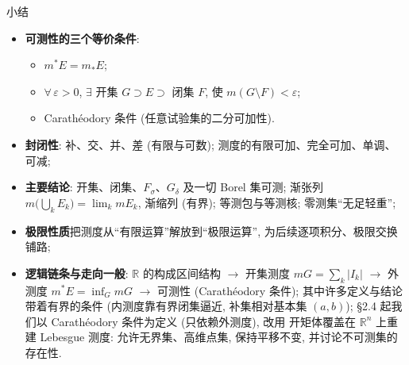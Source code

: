 \begin{frame}{小结}

\begin{itemize}
\item \textbf{可测性的三个等价条件}:
\begin{itemize}
\item $m^* E = m_* E$;
\item $\forall\, \varepsilon > 0$, $\exists$ 开集 $G \supset E \supset$ 闭集 $F$, 使 $m(G \setminus F) < \varepsilon$;
\item Carath\'{e}odory 条件 (任意试验集的二分可加性).
\end{itemize}
\pause
\item \textbf{封闭性}: 补、交、并、差 (有限与可数); 测度的有限可加、完全可加、单调、可减;
\pause
\item \textbf{主要结论}: 开集、闭集、$F_\sigma$、$G_\delta$ 及一切 Borel 集可测; 渐张列 $m\big(\bigcup_k E_k\big) = \lim_k mE_k$, 渐缩列 (有界); 等测包与等测核; 零测集``无足轻重'';
\pause
\item \textbf{极限性质}把测度从``有限运算''解放到``极限运算'', 为后续逐项积分、极限交换铺路;
\pause
\item \textbf{逻辑链条与走向一般}: $\mathbb{R}$ 的构成区间结构 $\longrightarrow$ 开集测度 $mG = \sum_k |I_k|$ $\longrightarrow$ 外测度 $m^* E = \inf_G mG$ $\longrightarrow$ 可测性 (Carath\'{e}odory 条件); 其中许多定义与结论带着\alert{有界}的条件 (内测度靠有界闭集逼近, 补集相对基本集 $(a,b)$); §2.4 起我们\alert{以 Carath\'{e}odory 条件为定义} (只依赖外测度), 改用 \alert{开矩体覆盖}在 $\mathbb{R}^n$ 上重建 Lebesgue 测度: 允许\alert{无界集}、高维点集, 保持平移不变, 并讨论\alert{不可测集的存在性}.
\end{itemize}

\end{frame}






